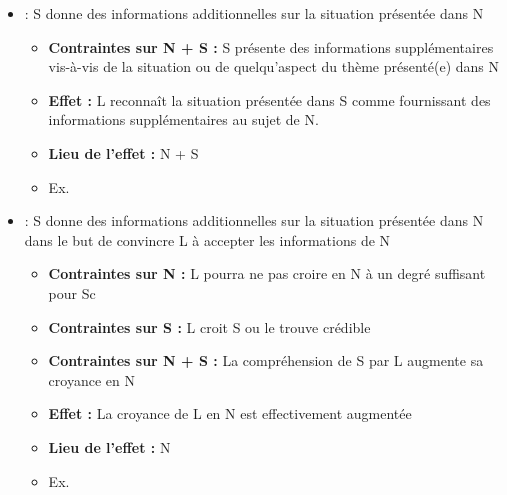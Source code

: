 \documentclass{KodeBook}
\begin{document}
\begin{itemize}
	\item {} :  S donne des informations additionnelles sur la situation présentée dans N
	\begin{itemize}
		\item \textbf{Contraintes sur N + S :} S présente des informations supplémentaires vis-à-vis de la situation ou de quelqu'aspect du thème présenté(e) dans N 
		\item \textbf{Effet :}  L reconnaît la situation présentée dans S comme fournissant des informations supplémentaires au sujet de N. 
		\item \textbf{Lieu de l'effet :} N + S
		\item Ex. 
	\end{itemize}
\end{itemize}

\begin{itemize}
	\item {} :  S donne des informations additionnelles sur la situation présentée dans N dans le but de convincre L à accepter les informations de N
	\begin{itemize}
		\item \textbf{Contraintes sur N :} L pourra ne pas croire en N à un degré suffisant pour Sc
		\item \textbf{Contraintes sur S :} L croit S ou le trouve crédible
		\item \textbf{Contraintes sur N + S :} La compréhension de S par L augmente sa croyance en N
		\item \textbf{Effet :}  La croyance de L en N est effectivement augmentée
		\item \textbf{Lieu de l'effet :} N
		\item Ex. 
	\end{itemize}
\end{itemize}
\end{document}
